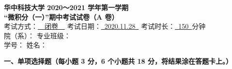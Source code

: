 \documentclass[a4paper,11pt]{ctexart}
\newcommand{\blank}[1][2.8cm]{\underline{\hspace{#1}}}
\begin{document}
\begin{center}
  {\Large\bfseries 华中科技大学 2020～2021 学年第一学期}\\[0.4em]
  {\Large\bfseries “微积分（一）”期中考试试卷（A 卷）}\\[0.9em]
  {\normalsize
    考试方式：\underline{\ \ 闭卷\ \ }\quad
    考试日期：\underline{\ 2020.11.28\ }\quad
    考试时长：\underline{\ 150\ }分钟
  }\\[0.6em]
  {\normalsize
    院（系）：\blank[4.2cm]\qquad
    专业班级：\blank[4.2cm]\\[0.3em]
    学\hspace{1em}号：\blank[4.2cm]\qquad
    姓\hspace{1em}名：\blank[4.2cm]
  }
\end{center}

\vspace{0.6em}

\textbf{一、单项选择题（每小题 3 分，6 个小题共 18 分，将结果涂在答题卡上。）}
\end{document}
